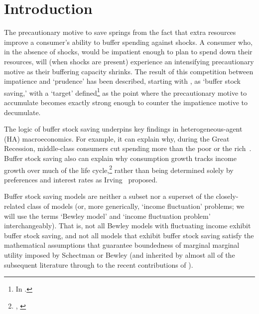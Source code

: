 \documentclass[BufferStockTheory]{subfiles}
\begin{document}
  \medskip\medskip
  \begin{minipage}{0.9\textwidth}
    \listoftables
  \end{minipage}

\hypersetup{pageanchor=true}  %

\pagebreak
\hypertarget{Introduction}{}
\section{Introduction}\label{sec:intro}
\setcounter{page}{0}

The precautionary motive to save springs from the fact that extra resources improve a consumer's ability to buffer spending against shocks.
A consumer who, in the absence of shocks, would be impatient enough to plan to spend down their resources, will (when shocks are present) experience an intensifying precautionary motive as their buffering capacity shrinks.
The result of this competition between impatience and `prudence' \citep{kimball:smallandlarge} has been described, starting with \cite{deatonLiqConstr}, as `buffer stock saving,' with a `target' defined\footnote{In \cite{carroll:brookings}.} as the point where the precautionary motive to accumulate becomes exactly strong enough to counter the impatience motive to decumulate.

The logic of buffer stock saving underpins key findings in heterogeneous-agent (HA) macroeconomics.
For example, it can explain why, during the Great Recession, middle-class consumers cut spending more than the poor or the rich~\citep{kmpHandbook}.
Buffer stock saving also can explain why consumption growth tracks income growth over much of the life cycle,\footnote{\cite{carrollBSLCPIH}, \cite{gpLifeCycle}} rather than being determined solely by preferences and interest rates as Irving~\cite{fisherInterestTheory} proposed.

Buffer stock saving models are neither a subset nor a superset of the closely-related class of \cite{bewleyPIH} models (or, more generically, \cite{schectman:fluctuation} `income fluctuation' problems; we will use the terms `Bewley model' and `income fluctuation problem' interchangeably).
That is, not all Bewley models with fluctuating income exhibit buffer stock saving, and not all models that exhibit buffer stock saving satisfy the mathematical assumptions that guarantee boundedness of marginal marginal utility imposed by Schectman or Bewley (and inherited by almost all of the subsequent literature through to the recent contributions of \cite{mstIncFluct,maUnboundedDP}). %
\end{document}
